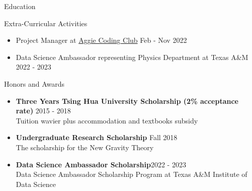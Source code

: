 \documentclass{resume}
\begin{document}
\begin{rSection}{Education}
\begin{rSection}{Extra-Curricular Activities}
    \begin{itemize}
        \item Project Manager at \href{https://aggiecodingclub.com/}{Aggie Coding Club} \hfill Feb - Nov 2022
        \item Data Science Ambassador representing Physics Department at Texas A\&M \hfill 2022 - 2023
    \end{itemize}
\end{rSection}








\begin{rSection}{Honors and Awards}
    \begin{itemize}
        \item \textbf{Three Years Tsing Hua University Scholarship (2\% acceptance rate)} \hfill 2015 - 2018 \\
        Tuition wavier plus accommodation and textbooks subsidy
        \item \textbf{Undergraduate Research Scholarship} \hfill Fall 2018 \\
        The scholarship for the New Gravity Theory
        \item \textbf{Data Science Ambassador Scholarship}\hfill 2022 - 2023\\
        Data Science Ambassador Scholarship Program at Texas A\&M Institute of Data Science
    \end{itemize}
\end{rSection}



\end{rSection}
\end{document}
